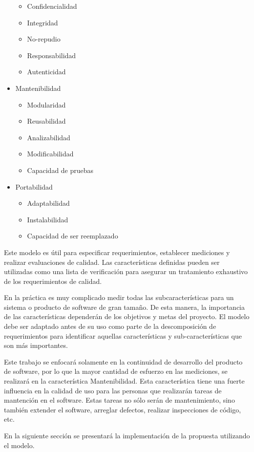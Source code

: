 \begin{itemize}
    \begin{itemize}
        \item Confidencialidad
        \item Integridad
        \item No-repudio
        \item Responsabilidad
        \item Autenticidad
    \end{itemize}
\item Mantenibilidad
    \begin{itemize}
        \item Modularidad
        \item Reusabilidad
        \item Analizabilidad
        \item Modificabilidad
        \item Capacidad de pruebas
    \end{itemize}
\item Portabilidad
    \begin{itemize}
        \item Adaptabilidad
        \item Instalabilidad
        \item Capacidad de ser reemplazado
    \end{itemize}
\end{itemize}

Este modelo es útil para especificar requerimientos, establecer mediciones y 
realizar evaluaciones de calidad. Las características definidas pueden ser utilizadas
como una lista de verificación para asegurar un tratamiento exhaustivo de
los requerimientos de calidad.

En la práctica es muy complicado medir todas las subcaracterísticas para un sistema
o producto de software de gran tamaño. De esta manera, la importancia de las 
características dependerán de los objetivos y metas del proyecto. El modelo
debe ser adaptado antes de su uso como parte de la descomposición de requerimientos
para identificar aquellas características y sub-características que son más
importantes.

Este trabajo se enfocará solamente en la continuidad de desarrollo del producto
de software, por lo que la mayor cantidad de esfuerzo en las mediciones, se
realizará en la característica Mantenibilidad. Esta característica tiene
una fuerte influencia en la calidad de uso para las personas que realizarán
tareas de mantención en el software. Estas tareas no sólo serán de mantenimiento,
sino también extender el software, arreglar defectos, realizar inspecciones
de código, etc.

En la siguiente sección se presentará la implementación de la propuesta
utilizando el modelo.

